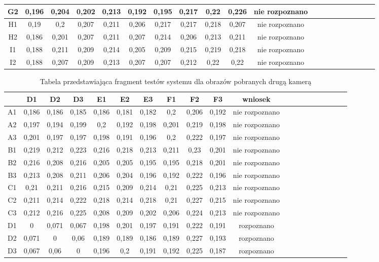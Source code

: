 \begin{table}
\begin{center}
\begin{tabular}{|c|c|c|c|c|c|c|c|c|c|c|c|c|c|c|c|c|c|c|l|}
G2 & 0,196&0,204&0,202&0,213&0,192&0,195&0,217&0,22&0,226 & nie rozpoznano\\ \hline
H1 & 0,19&0,2&0,207&0,211&0,206&0,217&0,217&0,218&0,207 & nie rozpoznano\\ \hline
H2 & 0,186&0,201&0,207&0,211&0,207&0,214&0,206&0,213&0,211 & nie rozpoznano\\ \hline
I1 & 0,188&0,211&0,209&0,214&0,205&0,209&0,215&0,219&0,218 & nie rozpoznano\\ \hline
I2 & 0,188&0,207&0,209&0,213&0,207&0,207&0,212&0,22&0,22 & nie rozpoznano\\ \hline
\end{tabular}
\end{center}
\end{table}

\begin{table}
\begin{center}
\caption{Tabela przedstawiająca fragment testów systemu dla obrazów pobranych drugą kamerą}
\label{tab:druga2}
\begin{tabular}{|c|c|c|c|c|c|c|c|c|c|c|c|c|c|c|c|c|c|c|l|}
\hline
 & D1 & D2 & D3 & E1 & E2 & E3 & F1 & F2 & F3 & wniosek\\ \hline
A1 & 0,186&0,186&0,185&0,186&0,181&0,182&0,2&0,206&0,192 & nie rozpoznano\\ \hline
A2 & 0,197&0,194&0,199&0,2&0,192&0,198&0,201&0,219&0,198 & nie rozpoznano\\ \hline
A3 & 0,201&0,197&0,197&0,198&0,191&0,196&0,2&0,222&0,197 & nie rozpoznano\\ \hline
B1 & 0,219&0,212&0,223&0,216&0,218&0,213&0,211&0,23&0,201 & nie rozpoznano\\ \hline
B2 & 0,216&0,208&0,216&0,205&0,205&0,195&0,195&0,218&0,201 & nie rozpoznano\\ \hline
B3 & 0,213&0,208&0,211&0,206&0,204&0,196&0,192&0,222&0,196 & nie rozpoznano\\ \hline
C1 & 0,21&0,211&0,216&0,215&0,209&0,214&0,21&0,225&0,213 & nie rozpoznano\\ \hline
C2 & 0,211&0,214&0,222&0,218&0,214&0,218&0,21&0,227&0,215 & nie rozpoznano\\ \hline
C3 & 0,212&0,216&0,225&0,208&0,209&0,202&0,206&0,224&0,213 & nie rozpoznano\\ \hline
D1 & 0&0,071&0,067&0,198&0,201&0,197&0,191&0,222&0,191 & rozpoznano\\ \hline
D2 & 0,071&0&0,06&0,189&0,189&0,186&0,189&0,227&0,193 & rozpoznano\\ \hline
D3 & 0,067&0,06&0&0,196&0,2&0,191&0,192&0,225&0,187 & rozpoznano\\ \hline

\end{tabular}
\end{center}
\end{table}
